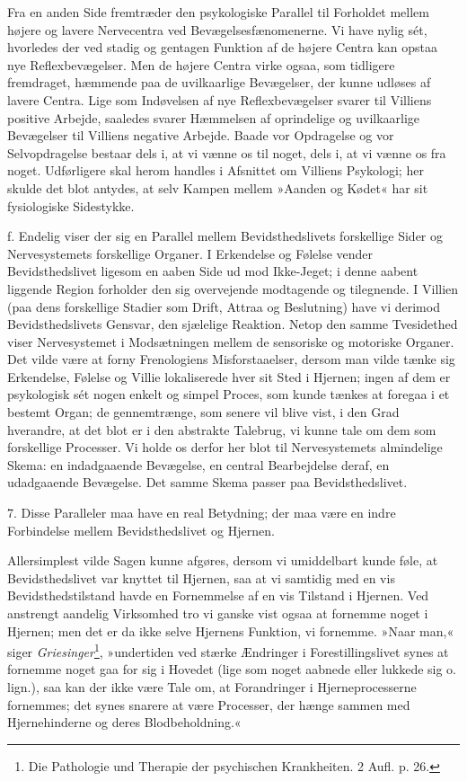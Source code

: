\documentclass[12pt,a4paper,openany]{book}
\newcommand{\opage}[1]{\marginnote{\footnotesize\textit{[#1]}}}
\begin{document}
Fra en anden Side fremtræder den psykologiske Parallel til Forholdet
mellem højere og lavere Nervecentra ved Bevægelsesfænomenerne. Vi have
nylig sét, hvorledes der ved stadig og gentagen Funktion af de højere
Centra kan opstaa nye Reflexbevægelser. Men de højere Centra virke
ogsaa, som tidligere fremdraget, hæmmende paa de uvilkaarlige
Bevægelser, der kunne udløses af lavere Centra. Lige som Indøvelsen af
nye Reflexbevægelser svarer til Villiens positive Arbejde, saaledes
svarer Hæmmelsen af oprindelige og uvilkaarlige Bevægelser til Villiens
negative Arbejde. Baade vor Opdragelse og vor Selvopdragelse bestaar
dels i, at vi vænne os til noget, dels i, at vi vænne os fra noget.
Udførligere skal herom handles i Afsnittet om Villiens Psykologi; her
skulde det blot antydes, at selv Kampen mellem »Aanden og Kødet« har sit
fysiologiske Sidestykke.

f. Endelig viser der sig en Parallel mellem Bevidsthedslivets
forskellige Sider og Nervesystemets forskellige Organer. I Erkendelse og
Følelse vender Bevidsthedslivet ligesom en aaben Side ud mod Ikke-Jeget;
i denne aabent liggende Region forholder den sig overvejende modtagende
og tilegnende.
\opage{64}I Villien (paa dens forskellige Stadier som Drift, Attraa og
Beslutning) have vi derimod Bevidsthedslivets Gensvar, den sjælelige
Reaktion. Netop den samme Tvesidethed viser Nervesystemet i Modsætningen
mellem de sensoriske og motoriske Organer. Det vilde være at forny
Frenologiens Misforstaaelser, dersom man vilde tænke sig Erkendelse,
Følelse og Villie lokaliserede hver sit Sted i Hjernen; ingen af dem er
psykologisk sét nogen enkelt og simpel Proces, som kunde tænkes at
foregaa i et bestemt Organ; de gennemtrænge, som senere vil blive vist,
i den Grad hverandre, at det blot er i den abstrakte Talebrug, vi kunne
tale om dem som forskellige Processer. Vi holde os derfor her blot til
Nervesystemets almindelige Skema: en indadgaaende Bevægelse, en central
Bearbejdelse deraf, en udadgaaende Bevægelse. Det samme Skema passer paa
Bevidsthedslivet.

7. Disse Paralleler maa have en real Betydning; der maa være en indre
Forbindelse mellem Bevidsthedslivet og Hjernen.

Allersimplest vilde Sagen kunne afgøres, dersom vi umiddelbart kunde
føle, at Bevidsthedslivet var knyttet til Hjernen, saa at vi samtidig
med en vis Bevidsthedstilstand havde en Fornemmelse af en vis Tilstand i
Hjernen. Ved anstrengt aandelig Virksomhed tro vi ganske vist ogsaa at
fornemme noget i Hjernen; men det er da ikke selve Hjernens Funktion, vi
fornemme. »Naar man,« siger \emph{Griesinger}\footnote[1]{Die Pathologie
und Therapie der psychischen Krankheiten. 2 Aufl. p. 26.}, »undertiden
ved stærke Ændringer i Forestillingslivet synes at fornemme noget gaa
for sig i Hovedet (lige som noget aabnede eller lukkede sig o. lign.),
saa kan der ikke være Tale om, at Forandringer i Hjerneprocesserne
fornemmes; det synes snarere at være Processer, der hænge sammen med
Hjernehinderne og deres Blodbeholdning.«
\end{document}
